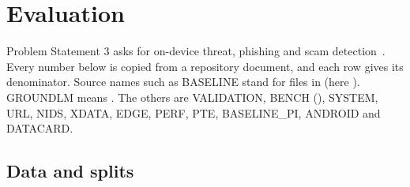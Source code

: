 \section{Evaluation}\label{sec:evaluation}

Problem Statement 3 asks for on-device threat, phishing and scam detection~\cite{ps3}. Every number below is copied from a repository document, and each row gives its denominator. Source names such as BASELINE stand for files in  (here ). GROUNDLM means . The others are VALIDATION, BENCH (), SYSTEM, URL, NIDS, XDATA, EDGE, PERF, PTE, BASELINE\allowbreak\_PI, ANDROID and DATACARD.

\subsection{Data and splits}

